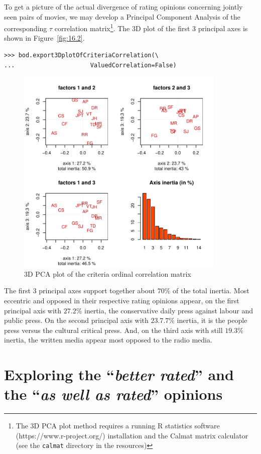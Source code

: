 To get a picture of the actual divergence of rating opinions concerning jointly seen pairs of movies, we may develop a Principal Component Analysis of the corresponding $\tau$ correlation matrix\footnote{The 3D PCA plot method requires a running R statistics software  (https://www.r-project.org/) installation and the Calmat matrix calculator (see the \texttt{calmat} directory in the \Digraph resources)}. The 3D plot of the first 3 principal axes is shown in Figure~\vref{fig:16.2}.
\begin{lstlisting}
>>> bod.export3DplotOfCriteriaCorrelation(\
...                     ValuedCorrelation=False)
\end{lstlisting}
\begin{figure}[ht]
\includegraphics[width=10cm]{Figures/16-4-correlationPCA.pdf}
\caption{3D PCA plot of the criteria ordinal correlation matrix}
\label{fig:16.4}       %
\end{figure}

The first 3 principal axes support together about $70\%$ of the total inertia. Most eccentric and opposed in their respective rating opinions appear, on the first principal axis with $27.2\%$ inertia, the conservative daily press against labour and public press. On the second principal axis with $23.7.7\%$ inertia, it is the people press versus the cultural critical press. And, on the third axis with still $19.3\%$ inertia, the written media appear most opposed to the radio media.

\section{Exploring the ``\emph{better rated}''  and the ``\emph{as well as rated}'' opinions}
\label{sec:16.5}

